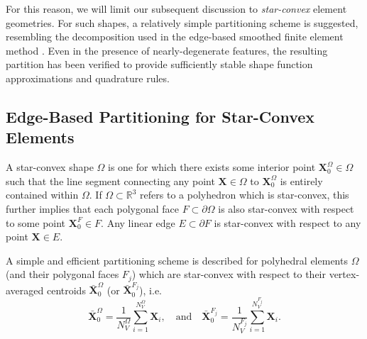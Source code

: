 	For this reason, we will limit our subsequent discussion to \textit{star-convex} element geometries. For such shapes, a relatively simple partitioning scheme is suggested, resembling the decomposition used in the edge-based smoothed finite element method \cite{Liu:09}. Even in the presence of nearly-degenerate features, the resulting partition has been verified to provide sufficiently stable shape function approximations and quadrature rules.

\subsection*{Edge-Based Partitioning for Star-Convex Elements}

	A star-convex shape $\Omega$ is one for which there exists some interior point $\bm{X}^{\Omega}_0 \in \Omega$ such that the line segment connecting any point $\bm{X} \in \Omega$ to $\bm{X}^{\Omega}_0$ is entirely contained within $\Omega$. If $\Omega \subset \mathbb{R}^3$ refers to a polyhedron which is star-convex, this further implies that each polygonal face $F \subset \partial \Omega$ is also star-convex with respect to some point $\bm{X}^{F}_0 \in F$. Any linear edge $E \subset \partial F$ is star-convex with respect to any point $\bm{X} \in E$.
	
	A simple and efficient partitioning scheme is described for polyhedral elements $\Omega$ (and their polygonal faces $F_j$) which are star-convex with respect to their vertex-averaged centroids $\bar{\bm{X}}^{\Omega}_0$ (or $\bar{\bm{X}}^{F_j}_0$), i.e.
	\begin{equation}
		\bar{\bm{X}}^{\Omega}_0 = \frac{1}{N^{\Omega}_V} \sum_{i = 1}^{N^{\Omega}_V} \bm{X}_{i}, \quad \text{and} \quad \bar{\bm{X}}^{F_j}_0 = \frac{1}{N^{F_j}_V} \sum_{i = 1}^{N^{F_j}_V} \bm{X}_{i}.
	\end{equation}
	
